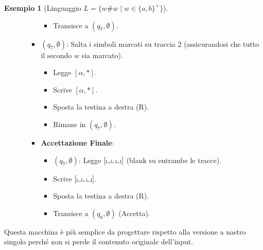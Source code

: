 \documentclass[a4paper]{article}
\theoremstyle{definition} %
\newtheorem{example}{Esempio}
\newcommand{\blankS}{\ensuremath{\raisebox{-0.15ex}{\scalebox{1.3}[0.7]{$\sqcup$}}}}
\begin{document}
\begin{example}[Linguaggio $L = \{w\#w \mid w \in \{a,b\}^+\}$]
\begin{itemize}
\begin{itemize}
\begin{itemize}
\begin{itemize}
                            \item Transisce a $(q_7, \emptyset)$.
                        \end{itemize}
                    \item $(q_7, \emptyset)$: Salta i simboli marcati su traccia 2 (assicurandosi che tutto il secondo $w$ sia marcato).
                        \begin{itemize}
                            \item Legge $[\alpha, *]$.
                            \item Scrive $[\alpha, *]$.
                            \item Sposta la testina a destra (R).
                            \item Rimane in $(q_7, \emptyset)$.
                        \end{itemize}
                    \item \textbf{Accettazione Finale}:
                        \begin{itemize}
                            \item $(q_7, \emptyset)$: Legge $[\blankS, \blankS]$ (blank su entrambe le tracce).
                            \item Scrive $[\blankS, \blankS]$.
                            \item Sposta la testina a destra (R).
                            \item Transisce a $(q_8, \emptyset)$ (Accetta).
                        \end{itemize}
                \end{itemize}
        \end{itemize}
\end{itemize}
Questa macchina è più semplice da progettare rispetto alla versione a nastro singolo perché non si perde il contenuto originale dell'input.
\end{example}
\end{document}
